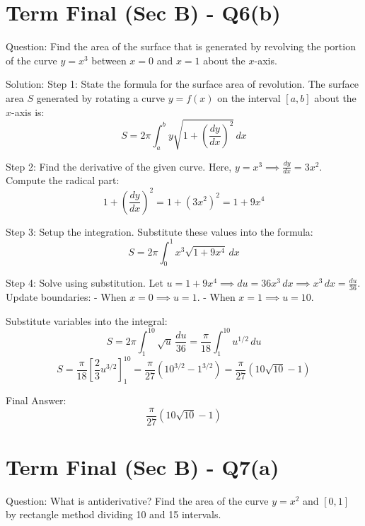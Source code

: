 \documentclass{article}
\begin{document}
\section*{Term Final (Sec B) - Q6(b)}
Question:
Find the area of the surface that is generated by revolving the portion of the curve $y = x^3$ between $x = 0$ and $x = 1$ about the $x$-axis.

Solution:
Step 1: State the formula for the surface area of revolution.
The surface area $S$ generated by rotating a curve $y = f(x)$ on the interval $[a, b]$ about the $x$-axis is:
\[
S = 2\pi \int_a^b y \sqrt{1 + \left(\frac{dy}{dx}\right)^2} \, dx
\]

Step 2: Find the derivative of the given curve.
Here, $y = x^3 \implies \frac{dy}{dx} = 3x^2$.
Compute the radical part:
\[
1 + \left(\frac{dy}{dx}\right)^2 = 1 + (3x^2)^2 = 1 + 9x^4
\]

Step 3: Setup the integration.
Substitute these values into the formula:
\[
S = 2\pi \int_0^1 x^3 \sqrt{1 + 9x^4} \, dx
\]

Step 4: Solve using substitution.
Let $u = 1 + 9x^4 \implies du = 36x^3 \, dx \implies x^3 \, dx = \frac{du}{36}$.
Update boundaries:
- When $x = 0 \implies u = 1$.
- When $x = 1 \implies u = 10$.

Substitute variables into the integral:
\[
S = 2\pi \int_1^{10} \sqrt{u} \, \frac{du}{36} = \frac{\pi}{18} \int_1^{10} u^{1/2} \, du
\]
\[
S = \frac{\pi}{18} \left[ \frac{2}{3}u^{3/2} \right]_1^{10} = \frac{\pi}{27} (10^{3/2} - 1^{3/2}) = \frac{\pi}{27}(10\sqrt{10} - 1)
\]

Final Answer:
\[
\boxed{\frac{\pi}{27}(10\sqrt{10} - 1)}
\]

\section*{Term Final (Sec B) - Q7(a)}
Question:
What is antiderivative? Find the area of the curve $y = x^2$ and $[0,1]$ by rectangle method dividing 10 and 15 intervals.
\end{document}
